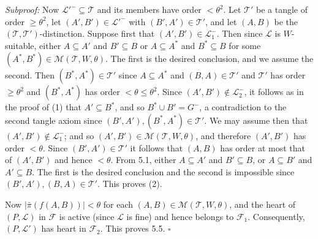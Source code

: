 \textit{Subproof:} Now $\mathcal{L}'^- \subseteq \mathcal{T}$ and its members have order $< \theta^2$. Let $\mathcal{T}'$ be a tangle of order $\ge \theta^2$, let $(A', B') \in \mathcal{L}'^-$ with $(B', A') \in \mathcal{T}'$, and let $(A, B)$ be the $(\mathcal{T}, \mathcal{T}')$-distinction. Suppose first that $(A', B') \in \mathcal{L}_1^-$. Then since $\mathcal{L}$ is $W$-suitable, either $A \subseteq A'$ and $B' \subseteq B$ or $A \subseteq A^*$ and $B^* \subseteq B$ for some $(A^*, B^*) \in \mathcal{M}(\mathcal{T}, W, \theta)$. The first is the desired conclusion, and we assume the second. Then $(B^*, A^*) \in \mathcal{T}'$ since $A \subseteq A^*$ and $(B, A) \in \mathcal{T}'$ and $\mathcal{T}'$ has order $\ge \theta^2$ and $(B^*, A^*)$ has order $< \theta \le \theta^2$. Since $(A', B') \notin \mathcal{L}_2^-$, it follows as in the proof of (1) that $A' \subseteq B^*$, and so $B^* \cup B' = G^-$, a contradiction to the second tangle axiom since $(B', A'), (B^*, A^*) \in \mathcal{T}'$. We may assume then that $(A', B') \notin \mathcal{L}_1^-$; and so $(A', B') \in \mathcal{M}(\mathcal{T}, W, \theta)$, and therefore $(A', B')$ has order $< \theta$. Since $(B', A') \in \mathcal{T}'$ it follows that $(A, B)$ has order at most that of $(A', B')$ and hence $< \theta$. From 5.1, either $A \subseteq A'$ and $B' \subseteq B$, or $A \subseteq B'$ and $A' \subseteq B$. The first is the desired conclusion and the second is impossible since $(B', A'), (B, A) \in \mathcal{T}'$. This proves (2).

Now $|\bar{\pi}(f(A, B))| < \theta$ for each $(A, B) \in \mathcal{M}(\mathcal{T}, W, \theta)$, and the heart of $(P, \mathcal{L})$ in $\mathcal{F}$ is active (since $\mathcal{L}$ is fine) and hence belongs to $\mathcal{F}_1$. Consequently, $(P, \mathcal{L}')$ has heart in $\mathcal{F}_2$. This proves 5.5. $\square$
